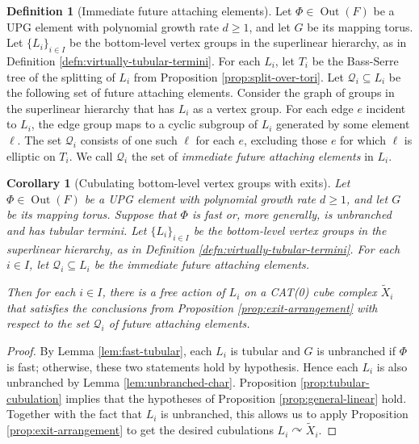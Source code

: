 \documentclass[11pt,oneside]{amsart}
\newtheorem{cor}[thm]{Corollary}
\theoremstyle{definition}
\newtheorem{defn}[thm]{Definition}
\DeclareMathOperator{\Out}{Out}
\newcommand{\actson}{\curvearrowright}
\begin{document}
\begin{defn}[Immediate future attaching elements]\label{defn:terminal-Q_i}
Let $\Phi\in\Out(F)$ be a UPG element with polynomial growth rate $d\geq 1$, and let $G$ be its mapping torus.  Let $\{L_i\}_{i\in I}$ be the bottom-level vertex groups in the superlinear hierarchy, as in Definition \ref{defn:virtually-tubular-termini}.  For each $L_i$, let $T_i$ be the Bass-Serre tree of the splitting of $L_i$ from Proposition \ref{prop:split-over-tori}.  Let $\mathcal Q_i\subseteq L_i$ be the following set of future attaching elements.  Consider the graph of groups in the superlinear hierarchy that has $L_i$ as a vertex group.  For each edge $e$ incident to $L_i$, the edge group maps to a cyclic subgroup of $L_i$ generated by some element $\ell$.  The set $\mathcal Q_i$ consists of one such $\ell$ for each $e$, excluding those $e$ for which $\ell$ is elliptic on $T_i$.  We call $\mathcal Q_i$ the set of \emph{immediate future attaching elements} in $L_i$.
\end{defn}


\begin{cor}[Cubulating bottom-level vertex groups with exits]\label{cor:cubulated-with-exits}
Let $\Phi\in\Out(F)$ be a UPG element with polynomial growth rate $d\geq 1$, and let $G$ be its mapping torus.  Suppose that $\Phi$ is fast or, more generally, is unbranched and has tubular termini.  Let $\{L_i\}_{i\in I}$ be the bottom-level vertex groups in the superlinear hierarchy, as in Definition \ref{defn:virtually-tubular-termini}.  For each $i\in I$, let $\mathcal Q_i\subseteq L_i$ be the immediate future attaching elements.

Then for each $i\in I$, there is a free action of $L_i$ on a CAT(0) cube complex $\widetilde X_i$ that satisfies the conclusions from Proposition \ref{prop:exit-arrangement} with respect to the set $\mathcal Q_i$ of future attaching elements.
\end{cor}

\begin{proof}
By Lemma \ref{lem:fast-tubular}, each $L_i$ is tubular and $G$ is unbranched if $\Phi$ is fast; otherwise, these two statements hold by hypothesis.  Hence each $L_i$ is also unbranched by Lemma \ref{lem:unbranched-char}.  Proposition \ref{prop:tubular-cubulation} implies that the hypotheses of Proposition \ref{prop:general-linear} hold.  Together with the fact that $L_i$ is unbranched, this allows us to apply Proposition \ref{prop:exit-arrangement} to get the  desired cubulations $L_i\actson \widetilde X_i$.
\end{proof}
\end{document}
